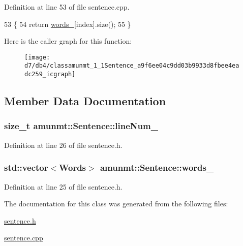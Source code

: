 Definition at line 53 of file sentence.\+cpp.


\begin{DoxyCode}
53                                         \{
54   \textcolor{keywordflow}{return} \hyperlink{classamunmt_1_1Sentence_a471f42578c2547cd66b903e3da22dc78}{words\_}[index].size();
55 \}
\end{DoxyCode}


Here is the caller graph for this function\+:
\nopagebreak
\begin{figure}[H]
\begin{center}
\leavevmode
\texttt{[image: d7/db4/classamunmt\_1\_1Sentence\_a9f6ee04c9dd03b9933d8fbee4eadc259\_icgraph]}
\end{center}
\end{figure}




\subsection{Member Data Documentation}
\subsubsection[{\texorpdfstring{line\+Num\+\_\+}{lineNum_}}]{\setlength{\rightskip}{0pt plus 5cm}size\+\_\+t amunmt\+::\+Sentence\+::line\+Num\+\_\+\hspace{0.3cm}{\ttfamily [private]}}\hypertarget{classamunmt_1_1Sentence_af0413112c4e70c373cff66cffa0f4dfa}{}\label{classamunmt_1_1Sentence_af0413112c4e70c373cff66cffa0f4dfa}


Definition at line 26 of file sentence.\+h.

\subsubsection[{\texorpdfstring{words\+\_\+}{words_}}]{\setlength{\rightskip}{0pt plus 5cm}std\+::vector$<${\bf Words}$>$ amunmt\+::\+Sentence\+::words\+\_\+\hspace{0.3cm}{\ttfamily [private]}}\hypertarget{classamunmt_1_1Sentence_a471f42578c2547cd66b903e3da22dc78}{}\label{classamunmt_1_1Sentence_a471f42578c2547cd66b903e3da22dc78}


Definition at line 25 of file sentence.\+h.



The documentation for this class was generated from the following files\+:\begin{DoxyCompactItemize}
\item 
\hyperlink{sentence_8h}{sentence.\+h}\item 
\hyperlink{sentence_8cpp}{sentence.\+cpp}\end{DoxyCompactItemize}

